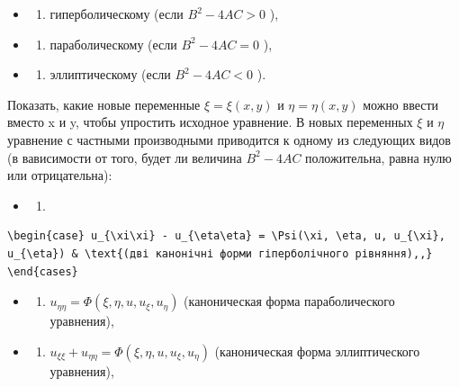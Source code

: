 \documentclass[
  ukrainian,
]{article}
\providecommand{\tightlist}{%
  \setlength{\itemsep}{0pt}\setlength{\parskip}{0pt}}
\begin{document}
\begin{itemize}
\tightlist
\item
  \begin{enumerate}
  \def\labelenumi{\arabic{enumi})}
  \tightlist
  \item
    гиперболическому (если \(B^2 - 4AC > 0\) ),
  \end{enumerate}
\item
  \begin{enumerate}
  \def\labelenumi{\arabic{enumi})}
  \setcounter{enumi}{1}
  \tightlist
  \item
    параболическому (если \(B^2 - 4AC = 0\) ),
  \end{enumerate}
\item
  \begin{enumerate}
  \def\labelenumi{\arabic{enumi})}
  \setcounter{enumi}{2}
  \tightlist
  \item
    эллиптическому (если \(B^2 - 4AC < 0\) ).
  \end{enumerate}
\end{itemize}

Показать, какие новые переменные \(\xi = \xi(x, y)\) и
\(\eta = \eta(x, y)\) можно ввести вместо x и y, чтобы упростить
исходное уравнение. В новых переменных \(\xi\) и \(\eta\) уравнение с
частными производными приводится к одному из следующих видов (в
вависимости от того, будет ли величина \(B^2 - 4AC\) положительна, равна
нулю или отрицательна):

\begin{itemize}
\tightlist
\item
  \begin{enumerate}
  \def\labelenumi{\arabic{enumi}.}
  \tightlist
  \item
  \end{enumerate}
\end{itemize}

\begin{verbatim}
\begin{case} u_{\xi\xi} - u_{\eta\eta} = \Psi(\xi, \eta, u, u_{\xi}, u_{\eta}) & \text{(дві канонічні форми гіперболічного рівняння),,} \end{cases}
\end{verbatim}

\begin{itemize}
\tightlist
\item
  \begin{enumerate}
  \def\labelenumi{\arabic{enumi}.}
  \setcounter{enumi}{1}
  \tightlist
  \item
    \(u_{\eta\eta} = \Phi(\xi, \eta, u, u_{\xi}, u_{\eta})\)
    (каноническая форма параболического уравнения),
  \end{enumerate}
\item
  \begin{enumerate}
  \def\labelenumi{\arabic{enumi}.}
  \setcounter{enumi}{2}
  \tightlist
  \item
    \(u_{\xi\xi} + u_{\eta\eta} = \Phi(\xi, \eta, u, u_{\xi}, u_{\eta})\)
    (каноническая форма эллиптического уравнения),
  \end{enumerate}
\end{itemize}
\end{document}
